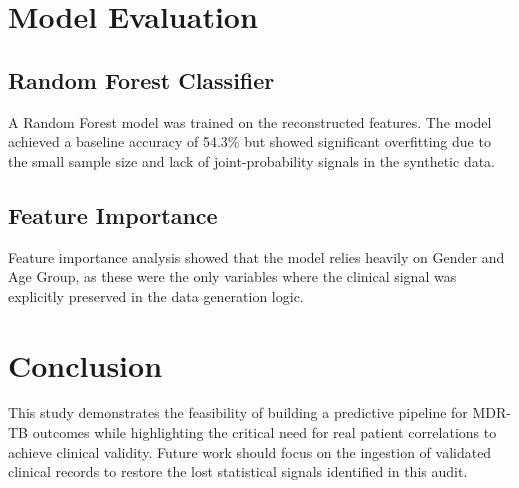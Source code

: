 \documentclass[12pt,a4paper]{report}
\begin{document}
\chapter{Model Evaluation}
\section{Random Forest Classifier}
A Random Forest model was trained on the reconstructed features. The model achieved a baseline accuracy of 54.3\% but showed significant overfitting due to the small sample size and lack of joint-probability signals in the synthetic data.

\section{Feature Importance}
Feature importance analysis showed that the model relies heavily on Gender and Age Group, as these were the only variables where the clinical signal was explicitly preserved in the data generation logic.

\chapter{Conclusion}
This study demonstrates the feasibility of building a predictive pipeline for MDR-TB outcomes while highlighting the critical need for real patient correlations to achieve clinical validity. Future work should focus on the ingestion of validated clinical records to restore the lost statistical signals identified in this audit.
\end{document}

